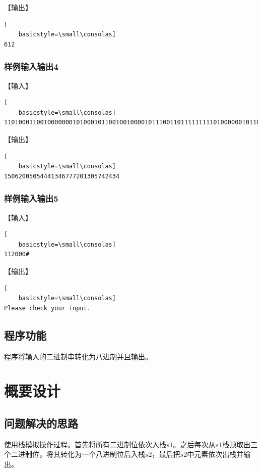 \documentclass{article}
\begin{document}
【输出】

\begin{lstlisting}[
    basicstyle=\small\consolas]
612
\end{lstlisting}

\subsubsection{样例输入输出4}

【输入】

\begin{lstlisting}[
    basicstyle=\small\consolas]
1101000110010000000101000101100100100001011100110111111111010000001011000101111100010100011100#
\end{lstlisting}

【输出】

\begin{lstlisting}[
    basicstyle=\small\consolas]
15062005054441346777201305742434
\end{lstlisting}

\subsubsection{样例输入输出5}

【输入】

\begin{lstlisting}[
    basicstyle=\small\consolas]
112000#
\end{lstlisting}

【输出】

\begin{lstlisting}[
    basicstyle=\small\consolas]
Please check your input.
\end{lstlisting}

\subsection{程序功能}

程序将输入的二进制串转化为八进制并且输出。

\section{概要设计}

\subsection{问题解决的思路}

使用栈模拟操作过程。首先将所有二进制位依次入栈$s1$。之后每次从$s1$栈顶取出三个二进制位，将其转化为一个八进制位后入栈$s2$，最后把$s2$中元素依次出栈并输出。
\end{document}
